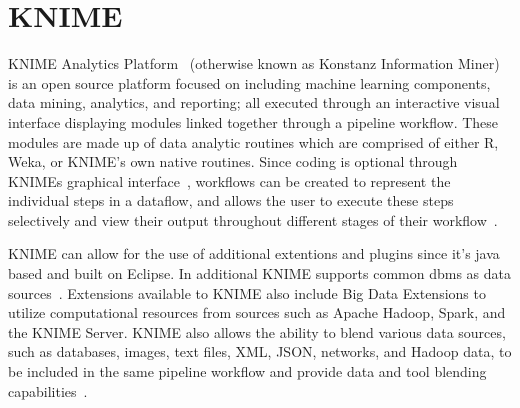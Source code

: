 \section{KNIME}

KNIME Analytics Platform~\cite{hid-sp18-504-pred-knime} (otherwise
known as Konstanz Information Miner) is an open source 
platform focused on including machine learning components,
data mining, analytics, and reporting; all executed through
an interactive visual interface displaying modules linked
together through a pipeline workflow. These modules are made
up of data analytic routines which are comprised of either R,
Weka, or KNIME's own native routines. Since coding is optional
through KNIMEs graphical interface~\cite{hid-sp18-504-knime},
workflows can be created to represent the individual steps in
a dataflow, and allows the user to execute these steps selectively
and view their output throughout different stages of their workflow~\cite{hid-sp18-504-pred-knime}.

KNIME can allow for the use of additional extentions and plugins
since it's java based and built on Eclipse. In additional KNIME
supports common dbms as data sources~\cite{hid-sp18-504-pred-knime}.
Extensions available to KNIME also include Big Data Extensions
to utilize computational resources from sources such as Apache
Hadoop, Spark, and the KNIME Server. KNIME also allows the ability
to blend various data sources, such as databases, images, text files,
XML, JSON, networks, and Hadoop data, to be included in the same
pipeline workflow and provide data and tool blending capabilities~\cite{hid-sp18-504-knime}.
